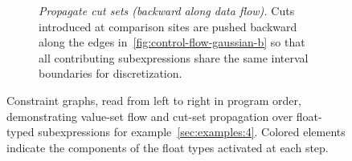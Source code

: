\begin{figure}[t]
\begin{subfigure}[t]{\textwidth}
\begin{minipage}[c]{0.62\textwidth}
{\begin{tikzpicture}
    \end{tikzpicture}
    }
    \end{minipage}\hfill
    \begin{minipage}[c]{0.35\textwidth}
    \caption{\emph{Propagate cut sets (backward along data flow).} Cuts introduced at comparison sites are pushed backward along the edges in~\ref{fig:control-flow-gaussian-b} so that all contributing subexpressions share the same interval boundaries for discretization.}
    \label{fig:control-flow-gaussian-d}
    \end{minipage}
    \end{subfigure}
    \vspace{0.8cm}

    \caption{Constraint graphs, read from left to right in program order, demonstrating value-set flow and cut-set propagation over float-typed subexpressions for example~\ref{sec:examples:4}. Colored elements indicate the components of the float types activated at each step.}
    \label{fig:control-flow-gaussian}
\end{figure}
